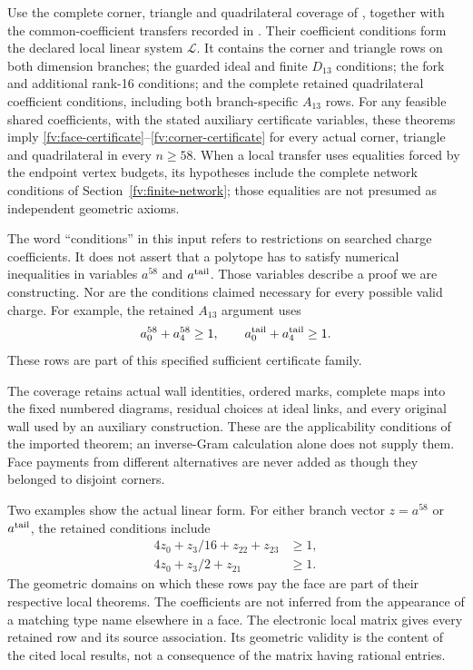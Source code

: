 \begin{assumption}\label{fv:face-assumption}
Use the complete corner, triangle and quadrilateral coverage of
\cite{BoundsSupplement}, together with the common-coefficient
transfers recorded in \cite{LPRepository}. Their coefficient conditions
form the declared local linear system $\mathcal L$. It contains the
corner and triangle rows on both dimension branches; the guarded
ideal and finite $D_{13}$ conditions; the fork and additional
rank-16 conditions; and the complete retained quadrilateral
coefficient conditions, including both branch-specific $A_{13}$ rows.
For any feasible shared coefficients, with the stated auxiliary
certificate variables, these theorems imply
\eqref{fv:face-certificate}--\eqref{fv:corner-certificate} for every
actual corner, triangle and quadrilateral in every $n\ge58$.
When a local transfer uses equalities forced by the endpoint vertex
budgets, its hypotheses include the complete network conditions of
Section~\ref{fv:finite-network}; those equalities are not presumed as
independent geometric axioms.
\end{assumption}

The word ``conditions'' in this input refers to restrictions
on searched charge coefficients. It does not assert that a polytope
has to satisfy numerical inequalities in variables $a^{58}$ and
$a^{\rm tail}$. Those variables describe a proof we are constructing.
Nor are the conditions claimed necessary for every possible valid
charge. For example, the retained $A_{13}$ argument uses
\begin{equation}\label{fv:A13-rows}
 a^{58}_0+a^{58}_4\ge1,
 \qquad a^{\rm tail}_0+a^{\rm tail}_4\ge1.
\end{equation}
These rows are part of this specified sufficient certificate family.

The coverage retains actual wall identities, ordered marks, complete
maps into the fixed numbered diagrams, residual choices at ideal links,
and every original wall used by an auxiliary construction. These are
the applicability conditions of the imported theorem; an inverse-Gram
calculation alone does not supply them. Face payments from different
alternatives are never added as though they belonged to disjoint corners.

Two examples show the actual linear form. For either branch vector
$z=a^{58}$ or $a^{\rm tail}$, the retained conditions include
\begin{align}
 4z_0+z_3/16+z_{22}+z_{23}&\ge1,
       \label{fv:example-face-P}\\
 4z_0+z_3/2+z_{21}&\ge1.
       \label{fv:example-face-M}
\end{align}
The geometric domains on which these rows pay the face are part
of their respective local theorems. The coefficients are not inferred
from the appearance of a matching type name elsewhere in a face.
The electronic local matrix gives every retained row and its source
association. Its geometric validity is the content of the cited local
results, not a consequence of the matrix having rational entries.

